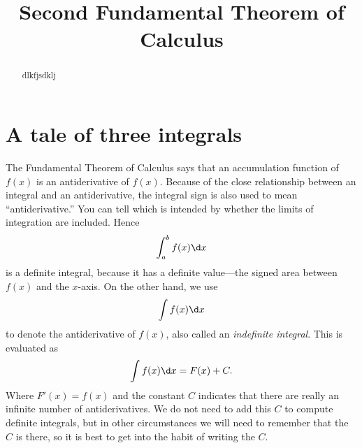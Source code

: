 \documentclass{ximera}
\title[Dig-In:]{Second Fundamental Theorem of Calculus}
\begin{document}
\begin{abstract}
dlkfjsdklj  
\end{abstract}
\maketitle







\section{A tale of three integrals}


The Fundamental Theorem of Calculus says that an accumulation function
of $f(x)$ is an antiderivative of $f(x)$.  Because of the close
relationship between an integral and an antiderivative, the integral
sign is also used to mean ``antiderivative.'' You can tell which is
intended by whether the limits of integration are included. Hence
\[
  \int_a^b f(x)\d x
\] 
is a definite integral, because it has a definite value---the signed
area between $f(x)$ and the $x$-axis.  On the other hand, we use
\[
  \int f(x)\d x
\]
to denote the antiderivative of $f(x)$, also called an
\textit{indefinite integral}.
This is evaluated as
\[
  \int f(x)\d x = F(x)+C.
\]
Where $F'(x) = f(x)$ and the constant $C$ indicates that there are
really an infinite number of antiderivatives. We do not need to add
this $C$ to compute definite integrals, but in other circumstances we
will need to remember that the $C$ is there, so it is best to get into
the habit of writing the $C$.
\end{document}
